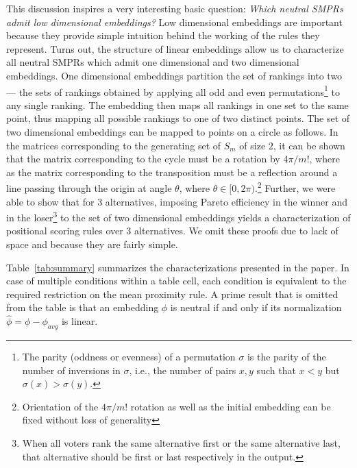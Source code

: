 \documentclass[prodmode]{acmsmall-ec14}
\begin{document}
This discussion inspires a very interesting basic question: \emph{Which neutral SMPRs admit low dimensional embeddings?} Low dimensional embeddings are important because they provide simple intuition behind the working of the rules they represent. Turns out, the structure of linear embeddings allow us to characterize all neutral SMPRs which admit one dimensional and two dimensional embeddings. One dimensional embeddings partition the set of rankings into two --- the sets of rankings obtained by applying all odd and even permutations\footnote{The parity (oddness or evenness) of a permutation $\sigma$ is the parity of the number of inversions in $\sigma$, i.e., the number of pairs $x,y$ such that $x < y$ but $\sigma(x) > \sigma(y)$.} to any single ranking. The embedding then maps all rankings in one set to the same point, thus mapping all possible rankings to one of two distinct points. The set of two dimensional embeddings can be mapped to points on a circle as follows. In the matrices corresponding to the generating set of $S_m$ of size $2$, it can be shown that the matrix corresponding to the cycle must be a rotation by $4 \pi / m!$, where as the matrix corresponding to the transposition must be a reflection around a line passing through the origin at angle $\theta$, where $\theta \in [0,2\pi)$.\footnote{Orientation of the $4\pi/m!$ rotation as well as the initial embedding can be fixed without loss of generality} Further, we were able to show that for $3$ alternatives, imposing Pareto efficiency in the winner and in the loser\footnote{When all voters rank the same alternative first or the same alternative last, that alternative should be first or last respectively in the output.} to the set of two dimensional embeddings yields a characterization of positional scoring rules over $3$ alternatives. We omit these proofs due to lack of space and because they are fairly simple. 

Table~\ref{tab:summary} summarizes the characterizations presented in the paper. In case of multiple conditions within a table cell, each condition is equivalent to the required restriction on the mean proximity rule. A prime result that is omitted from the table is that an embedding $\phi$ is neutral if and only if its normalization $\hat{\phi} = \phi-\phi_{avg}$ is linear. 
\end{document}
